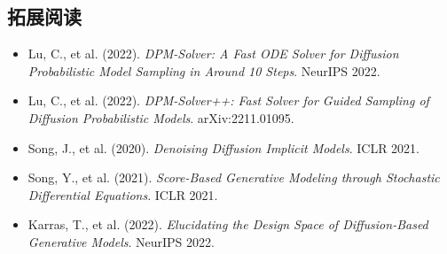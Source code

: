 \documentclass[a4paper]{article}
\begin{document}
\subsection{拓展阅读}

\begin{itemize}
    \item Lu, C., et al. (2022). \textit{DPM-Solver: A Fast ODE Solver for Diffusion Probabilistic Model Sampling in Around 10 Steps}. NeurIPS 2022.
    \item Lu, C., et al. (2022). \textit{DPM-Solver++: Fast Solver for Guided Sampling of Diffusion Probabilistic Models}. arXiv:2211.01095.
    \item Song, J., et al. (2020). \textit{Denoising Diffusion Implicit Models}. ICLR 2021.
    \item Song, Y., et al. (2021). \textit{Score-Based Generative Modeling through Stochastic Differential Equations}. ICLR 2021.
    \item Karras, T., et al. (2022). \textit{Elucidating the Design Space of Diffusion-Based Generative Models}. NeurIPS 2022.
\end{itemize}

\end{document}
